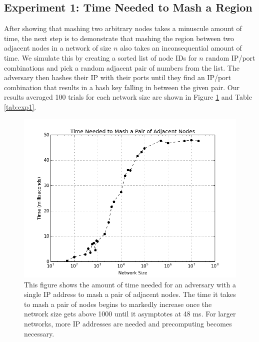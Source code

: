 \subsection{Experiment 1:  Time Needed to Mash a Region}
\label{sec:exp1}
After showing that mashing two arbitrary nodes takes a minuscule amount of time, the next step is to demonstrate that mashing the region between two adjacent nodes in a network of size $n$ also takes an inconsequential amount of time.
We simulate this by creating a sorted list of node IDs for $n$ random IP/port combinations and pick a random adjacent pair of numbers from the list.
The adversary then hashes their IP with their ports until they find an IP/port combination that results in a hash key falling in between the given pair.
Our results averaged 100 trials for each network size are shown in Figure \ref{fig:exp1} and Table \ref{tab:exp1}.

\begin{figure}
	\centering
	\includegraphics[width=0.7\linewidth]{figs/size_time}
	\caption[Mashing time.]{This figure shows the amount of time needed for an adversary with a single IP address to mash a pair of adjacent nodes.  The time it takes to mash a pair of nodes begins to markedly increase once the network size gets above 1000 until it asymptotes at 48 ms.  For larger networks, more IP addresses are needed and precomputing becomes necessary.}
	\label{fig:exp1}
\end{figure}


